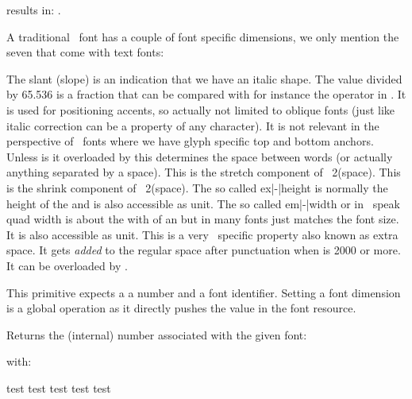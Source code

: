 results in: \inlinebuffer.

\stopoldprimitive

\startoldprimitive[title={\prm {fontdimen}}][obsolete=yes]

A traditional \TEX\ font has a couple of font specific dimensions, we only
mention the seven that come with text fonts:

\startitemize[n,packed]
\startitem
    The slant (slope) is an indication that we have an italic shape. The value
    divided by 65.536 is a fraction that can be compared with for instance the
     operator in \METAPOST. It is used for positioning accents, so
    actually not limited to oblique fonts (just like italic correction can be a
    property of any character). It is not relevant in the perspective of
    \OPENTYPE\ fonts where we have glyph specific top and bottom anchors.
\stopitem
\startitem
    Unless is it overloaded by  this determines the space between
    words (or actually anything separated by a space).
\stopitem
\startitem
    This is the stretch component of ~2(space).
\startitem
    This is the shrink component of ~2(space).
\stopitem
\startitem
    The so called ex|-|height is normally the height of the  and is
    also accessible as  unit.
\stopitem
\startitem
    The so called em|-|width or in \TEX\ speak quad width is about the with of an
     but in many fonts just matches the font size. It is also
    accessible as  unit.
\stopitem
\startitem
    This is a very \TEX\ specific property also known as extra space. It gets
    {\em added} to the regular space after punctuation when  is
    2000 or more. It can be overloaded by .
\stopitem
\stopitemize

This primitive expects a a number and a font identifier. Setting a font dimension
is a global operation as it directly pushes the value in the font resource.

\stopoldprimitive

\startnewprimitive[title={\prm {fontid}}]

Returns the (internal) number associated with the given font:

\startbuffer
{\bf \xdef\MyFontA{\the\fontid\font}}
{\sl \xdef\MyFontB{\setfontid\the\fontid\font}}
\stopbuffer

\typebuffer \getbuffer

with:

\startbuffer
test {\setfontid\MyFontA test} test {\MyFontB test} test
\stopbuffer

